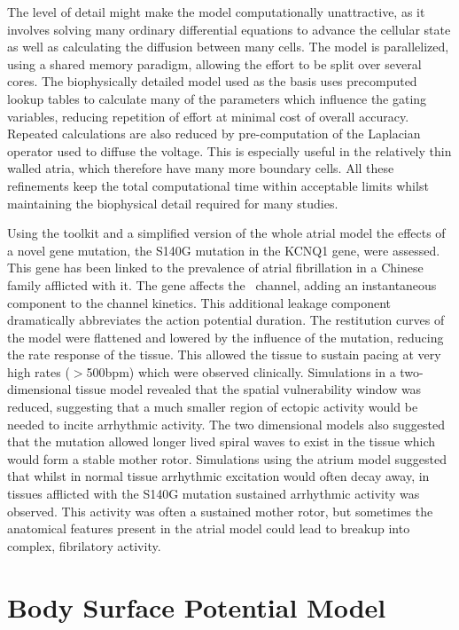 The level of detail might make the model computationally unattractive, as it
involves solving many ordinary differential equations to advance the cellular
state as well as calculating the diffusion between many cells.
The model is parallelized, using a shared memory paradigm, allowing the effort
to be split over several cores.
The biophysically detailed model used as the basis uses precomputed lookup
tables to calculate many of the parameters which influence the gating variables,
reducing repetition of effort at minimal cost of overall accuracy.
Repeated calculations are also reduced by pre-computation of the Laplacian
operator used to diffuse the voltage.
This is especially useful in the relatively thin walled atria, which therefore
have many more boundary cells.
All these refinements keep the total computational time within acceptable limits
whilst maintaining the biophysical detail required for many studies.

Using the toolkit and a simplified version of the whole atrial model the
effects of a novel gene mutation, the S140G mutation in the KCNQ1 gene, were
assessed.
This gene has been linked to the prevalence of atrial fibrillation in a Chinese
family afflicted with it.
The gene affects the \ channel, adding an instantaneous component to the
channel kinetics.
This additional leakage component dramatically abbreviates the action potential
duration. 
The restitution curves of the model were flattened and lowered by the influence of the
mutation, reducing the rate response of the tissue.
This allowed the tissue to sustain pacing at very high rates
($>$\unit{500}{bpm}) which were observed clinically.
Simulations in a two-dimensional tissue model revealed that the spatial
vulnerability window was reduced, suggesting that a much smaller region of
ectopic activity would be needed to incite arrhythmic activity.
The two dimensional models also suggested that the mutation allowed longer
lived spiral waves to exist in the tissue which would form a stable mother
rotor.
Simulations using the atrium model suggested that whilst in normal tissue
arrhythmic excitation would often decay away, in tissues afflicted with the
S140G mutation sustained arrhythmic activity was observed.
This activity was often a sustained mother rotor, but sometimes the anatomical
features present in the atrial model could lead to breakup into complex,
fibrilatory activity.

\section{Body Surface Potential Model}

